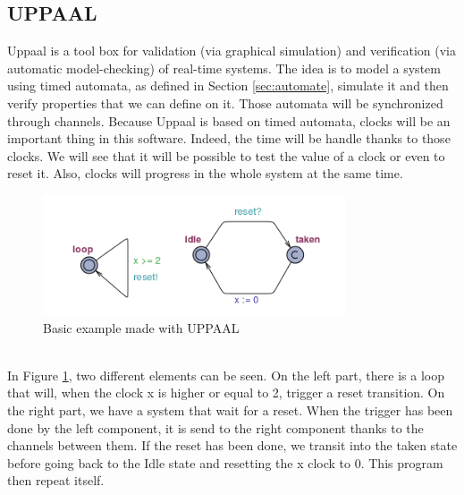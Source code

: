\subsection{UPPAAL}
Uppaal is a tool box for validation (via graphical simulation) and verification (via automatic model-checking) of real-time systems. The idea is to model a system using timed automata, as defined in Section \ref{sec:automate}, simulate it and then verify properties that we can define on it. Those automata will be synchronized through channels. Because Uppaal is based on timed automata, clocks will be an important thing in this software. Indeed, the time will be handle thanks to those clocks. We will see that it will be possible to test the value of a clock or even to reset it. Also, clocks will progress in the whole system at the same time.
\begin{figure}[h]\label{fig:uppaal}
  \begin{center}
    \includegraphics[width=0.8\textwidth]{picture/uppaal.png}
    \caption{Basic example made with UPPAAL}
  \end{center}
\end{figure} \\
 In Figure \ref{fig:uppaal}, two different elements can be seen. On the left part, there is a loop that will, when the clock x is higher or equal to 2, trigger a reset transition. On the right part, we have a system that wait for a reset. When the trigger has been done by the left component, it is send to the right component thanks to the channels between them. If the reset has been done, we transit into the taken state before going back to the Idle state and resetting the x clock to 0. This program then repeat itself.
 

